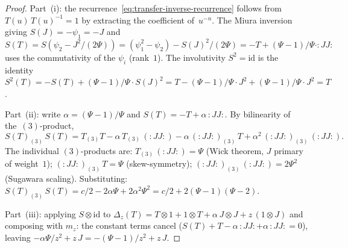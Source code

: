 \documentclass[11pt,reqno]{amsart}
\theoremstyle{definition}
\theoremstyle{remark}
\numberwithin{equation}{section}
\begin{document}
\begin{proof}
Part~(i): the recurrence~\eqref{eq:transfer-inverse-recurrence}
follows from $T(u)\, T(u)^{-1} = 1$ by extracting the
coefficient of~$u^{-n}$. The Miura inversion giving
$S(J) = -\psi_1 = -J$ and
$S(T) = S(\psi_2 - J^2/(2\Psi))
= (\psi_1^2 - \psi_2) - S(J)^2/(2\Psi)
= -T + (\Psi - 1)/\Psi \cdot {:}JJ{:}$
uses the commutativity of the $\psi_i$ (rank~$1$).
The involutivity $S^2 = \mathrm{id}$ is the identity
$S^2(T) = -S(T) + (\Psi-1)/\Psi \cdot S(J)^2
= T - (\Psi-1)/\Psi \cdot J^2
+ (\Psi-1)/\Psi \cdot J^2 = T$.

Part~(ii): write $\alpha = (\Psi - 1)/\Psi$
and $S(T) = -T + \alpha\,{:}JJ{:}$.
By bilinearity of the~$(3)$-product,
\[
  S(T)_{(3)}\, S(T)
  = T_{(3)}T
  - \alpha\, T_{(3)}\,({:}JJ{:})
  - \alpha\, ({:}JJ{:})_{(3)}\, T
  + \alpha^2\, ({:}JJ{:})_{(3)}\,({:}JJ{:}).
\]
The individual $(3)$-products are:
$T_{(3)}\,({:}JJ{:}) = \Psi$
(Wick theorem, $J$ primary of weight~$1$);
$({:}JJ{:})_{(3)}\, T = \Psi$
(skew-symmetry);
$({:}JJ{:})_{(3)}\,({:}JJ{:}) = 2\Psi^2$
(Sugawara scaling).
Substituting:
$S(T)_{(3)}\, S(T)
= c/2 - 2\alpha\Psi + 2\alpha^2 \Psi^2
= c/2 + 2(\Psi - 1)(\Psi - 2)$.

Part~(iii): applying $S \otimes \mathrm{id}$ to
$\Delta_z(T) = T \otimes 1 + 1 \otimes T
+ \alpha\, J \otimes J + z\,(1 \otimes J)$
and composing with $m_z$:
the constant terms cancel
($S(T) + T - \alpha\,{:}JJ{:} + \alpha\,{:}JJ{:} = 0$),
leaving $-\alpha\Psi/z^2 + z\, J
= -(\Psi - 1)/z^2 + z\, J$.
\end{proof}
\end{document}
